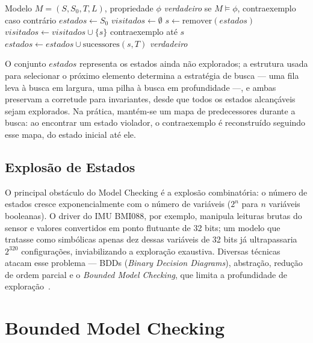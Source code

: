 \begin{algorithm}
\caption{Algoritmo de verificação de invariantes por busca no espaço de estados}
\label{alg:mc}
\begin{algorithmic}[1]
\Require Modelo $M = (S, S_0, T, L)$, propriedade $\phi$
\Ensure \textit{verdadeiro} se $M \models \phi$, contraexemplo caso contrário
\State $estados \leftarrow S_0$
\State $visitados \leftarrow \emptyset$
    \State $s \leftarrow \text{remover}(estados)$
        \State $visitados \leftarrow visitados \cup \{s\}$
            \State \Return contraexemplo até $s$
        \EndIf
        \State $estados \leftarrow estados \cup \text{sucessores}(s, T)$
    \EndIf
\EndWhile
\State \Return \textit{verdadeiro}
\end{algorithmic}
\end{algorithm}

O conjunto $estados$ representa os estados ainda não explorados; a estrutura usada
para selecionar o próximo elemento determina a estratégia de busca --- uma fila
leva à busca em largura, uma pilha à busca em profundidade ---, e ambas preservam
a corretude para invariantes, desde que todos os estados alcançáveis sejam
explorados. Na prática, mantém-se um mapa de predecessores durante a busca: ao
encontrar um estado violador, o contraexemplo é reconstruído seguindo esse mapa,
do estado inicial até ele.

\subsection{Explosão de Estados}

O principal obstáculo do Model Checking é a explosão combinatória: o número de
estados cresce exponencialmente com o número de variáveis ($2^n$ para $n$
variáveis booleanas). O driver do IMU BMI088, por exemplo, manipula leituras
brutas do sensor e valores convertidos em ponto flutuante de 32 bits; um modelo que
tratasse como simbólicas apenas dez dessas variáveis de 32 bits já ultrapassaria
$2^{320}$ configurações, inviabilizando a exploração exaustiva.
Diversas técnicas atacam esse problema ---
BDDs (\textit{Binary Decision Diagrams}), abstração, redução de ordem parcial e o
\textit{Bounded Model Checking}, que limita a profundidade de
exploração~\cite{Biere1999}.

\section{Bounded Model Checking}

